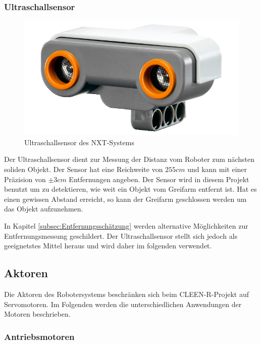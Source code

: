 \subsubsection{Ultraschallsensor}
\label{subsec:Ultraschallsensor}

\begin{figure}[h]
\centering
\includegraphics[width=\textwidth/3]{Bilder/Robot/distance_sensor}
\caption{Ultraschallsensor des NXT-Systems}
\label{fig:distanceSensor}
\end{figure}

Der Ultraschallsensor dient zur Messung der Distanz vom Roboter zum nächsten soliden Objekt. Der Sensor hat eine Reichweite von $255cm$ und kann mit einer Präzision von $\pm 3cm$ Entfernungen angeben. Der Sensor wird in diesem Projekt benutzt um zu detektieren, wie weit ein Objekt vom Greifarm entfernt ist. Hat es einen gewissen Abstand erreicht, so kann der Greifarm geschlossen werden um das Objekt aufzunehmen. 

In Kapitel \ref{subsec:Entfernungsschätzung} werden alternative Möglichkeiten zur Entfernungsmessung geschildert. Der Ultraschallsensor stellt sich jedoch als geeignetstes Mittel heraus und wird daher im folgenden verwendet.

\subsection{Aktoren}

Die Aktoren des Robotersystems beschränken sich beim CLEEN-R-Projekt auf Servomotoren. Im Folgenden werden die unterschiedlichen Anwendungen der Motoren beschrieben.

\subsubsection{Antriebsmotoren}

